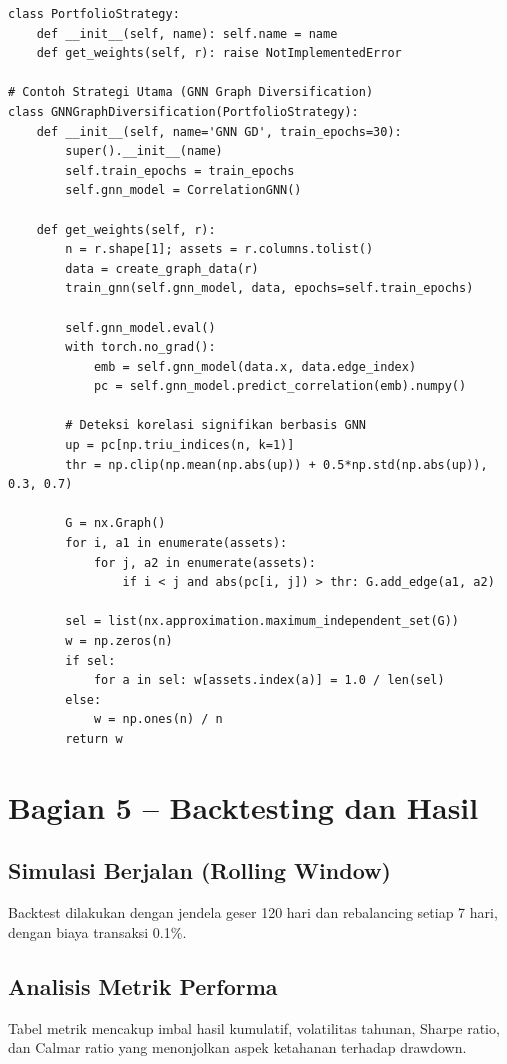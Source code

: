 \documentclass[12pt,a4paper]{article}
\begin{document}
\begin{lstlisting}[caption={Framework Strategi}]
class PortfolioStrategy:
    def __init__(self, name): self.name = name
    def get_weights(self, r): raise NotImplementedError

# Contoh Strategi Utama (GNN Graph Diversification)
class GNNGraphDiversification(PortfolioStrategy):
    def __init__(self, name='GNN GD', train_epochs=30):
        super().__init__(name)
        self.train_epochs = train_epochs
        self.gnn_model = CorrelationGNN()

    def get_weights(self, r):
        n = r.shape[1]; assets = r.columns.tolist()
        data = create_graph_data(r)
        train_gnn(self.gnn_model, data, epochs=self.train_epochs)
        
        self.gnn_model.eval()
        with torch.no_grad():
            emb = self.gnn_model(data.x, data.edge_index)
            pc = self.gnn_model.predict_correlation(emb).numpy()

        # Deteksi korelasi signifikan berbasis GNN
        up = pc[np.triu_indices(n, k=1)]
        thr = np.clip(np.mean(np.abs(up)) + 0.5*np.std(np.abs(up)), 0.3, 0.7)
        
        G = nx.Graph()
        for i, a1 in enumerate(assets):
            for j, a2 in enumerate(assets):
                if i < j and abs(pc[i, j]) > thr: G.add_edge(a1, a2)
        
        sel = list(nx.approximation.maximum_independent_set(G))
        w = np.zeros(n)
        if sel:
            for a in sel: w[assets.index(a)] = 1.0 / len(sel)
        else:
            w = np.ones(n) / n
        return w
\end{lstlisting}

\section{Bagian 5 -- Backtesting dan Hasil}

\subsection{Simulasi Berjalan (Rolling Window)}
Backtest dilakukan dengan jendela geser 120 hari dan rebalancing setiap 7 hari, dengan biaya transaksi 0.1\%.

\subsection{Analisis Metrik Performa}
Tabel metrik mencakup imbal hasil kumulatif, volatilitas tahunan, Sharpe ratio, dan Calmar ratio yang menonjolkan aspek ketahanan terhadap drawdown.
\end{document}
